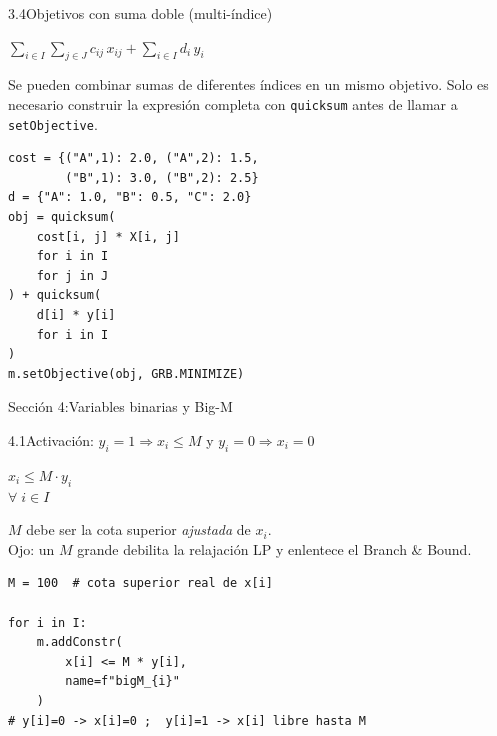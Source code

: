 \documentclass[10pt,a4paper]{article}
\newlength{\mathcolw}
\newlength{\codecolw}
\newcommand{\secheader}[2]{%
  \vspace{10pt}%
  \needspace{6cm}%
  \noindent%
  \begin{tcolorbox}[
    colback=sectionbg, colupper=white,
    colframe=sectionbg, sharp corners,
    left=8pt, right=8pt, top=5pt, bottom=5pt,
    fontupper=\large\bfseries\sffamily,
  ]
  Secci\'on #1:\enspace #2
  \end{tcolorbox}%
  \vspace{2pt}%
}
\newcommand{\entryheader}[1]{%
  \needspace{5cm}%
  \vspace{6pt}%
  \noindent%
  \begin{tcolorbox}[
    colback=subsecbg!18,
    colframe=subsecbg!45,
    sharp corners, boxrule=0.4pt,
    left=5pt, right=5pt, top=2pt, bottom=2pt,
    fontupper=\small\bfseries\sffamily,
  ]
  #1
  \end{tcolorbox}%
  \vspace{2pt}%
}
\newcommand{\py}[1]{\texttt{\small #1}}
\begin{document}
\entryheader{3.4\quad Objetivos con suma doble (multi-\'indice)}
\noindent
\begin{minipage}[t]{\mathcolw}
    \begin{tcolorbox}[mathbox]
        $\displaystyle\sum_{i \in I}\sum_{j \in J} c_{ij}\, x_{ij} + \sum_{i \in I} d_i\, y_i$
    \end{tcolorbox}
    \vspace{2pt}
    \begin{tcolorbox}[notebox]
        Se pueden combinar sumas de diferentes \'indices en un mismo objetivo. Solo es necesario construir la expresi\'on completa con \py{quicksum} antes de llamar a \py{setObjective}.
    \end{tcolorbox}
\end{minipage}\hspace{0.02\textwidth}%
\begin{minipage}[t]{\codecolw}
    \begin{lstlisting}[style=gurobipy]
cost = {("A",1): 2.0, ("A",2): 1.5,
        ("B",1): 3.0, ("B",2): 2.5}
d = {"A": 1.0, "B": 0.5, "C": 2.0}
obj = quicksum(
    cost[i, j] * X[i, j]
    for i in I
    for j in J
) + quicksum(
    d[i] * y[i]
    for i in I
)
m.setObjective(obj, GRB.MINIMIZE)
\end{lstlisting}
\end{minipage}

\vspace{4pt}
\secheader{4}{Variables binarias y Big-M}

\entryheader{4.1\quad Activaci\'on: $y_i = 1 \Rightarrow x_i \leq M$ y $y_i = 0 \Rightarrow x_i = 0$}
\noindent
\begin{minipage}[t]{\mathcolw}
    \begin{tcolorbox}[mathbox]
        $x_i \leq M \cdot y_i$\\[6pt]
        $\forall\; i \in I$
    \end{tcolorbox}
    \vspace{2pt}
    \begin{tcolorbox}[notebox]
        $M$ debe ser la cota superior \emph{ajustada} de $x_i$.\\
        Ojo: un $M$ grande debilita la relajaci\'on LP y enlentece el Branch \& Bound.
    \end{tcolorbox}
\end{minipage}\hspace{0.02\textwidth}%
\begin{minipage}[t]{\codecolw}
    \begin{lstlisting}[style=gurobipy]
M = 100  # cota superior real de x[i]

for i in I:
    m.addConstr(
        x[i] <= M * y[i],
        name=f"bigM_{i}"
    )
# y[i]=0 -> x[i]=0 ;  y[i]=1 -> x[i] libre hasta M
\end{lstlisting}
\end{minipage}
\end{document}
